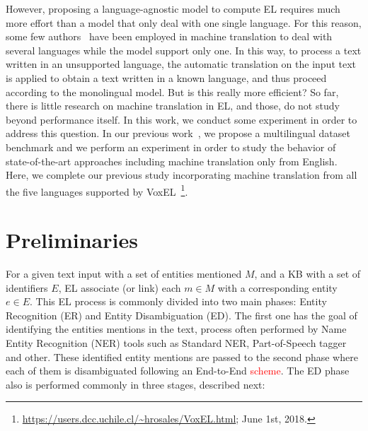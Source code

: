 \documentclass{llncs}
\begin{document}
However, proposing a language-agnostic model to compute EL requires much more effort than a model that only deal with one single language. For this reason, some few authors~\cite{Monahan2011,Cassidy2012} have been employed in machine translation to deal with several languages while the model support only one. In this way, to process a text written in an unsupported language, the automatic translation on the input text is applied to obtain a text written in a known language, and thus proceed according to the monolingual model. But is this really more efficient? So far, there is little research on machine translation in EL, and those, do not study beyond performance itself. In this work, we conduct some experiment in order to address this question. In our previous work~\cite{ourISWC}, we propose a multilingual dataset benchmark and we perform an experiment in order to study the behavior of state-of-the-art approaches including machine translation only from English. Here, we complete our previous study incorporating machine translation from all the five languages supported by VoxEL~\footnote{\url{https://users.dcc.uchile.cl/\~hrosales/VoxEL.html}; June 1st, 2018.}. 


\section{Preliminaries}

For a given text input with a set of entities mentioned $M$, and a KB with a set of  identifiers $E$, EL associate (or link) each $m\in{}M$ with a corresponding entity $e\in{}E$. This EL process is commonly divided into two main phases: Entity Recognition (ER) and Entity Disambiguation (ED). The first one has the goal of identifying the entities mentions in the text, process often performed by Name Entity Recognition (NER) tools such as Standard NER, Part-of-Speech tagger and other. These identified entity mentions are passed to the second phase where each of them is disambiguated following an End-to-End \textcolor{red}{scheme}. The ED phase also is performed commonly in three stages, described next:
\end{document}
